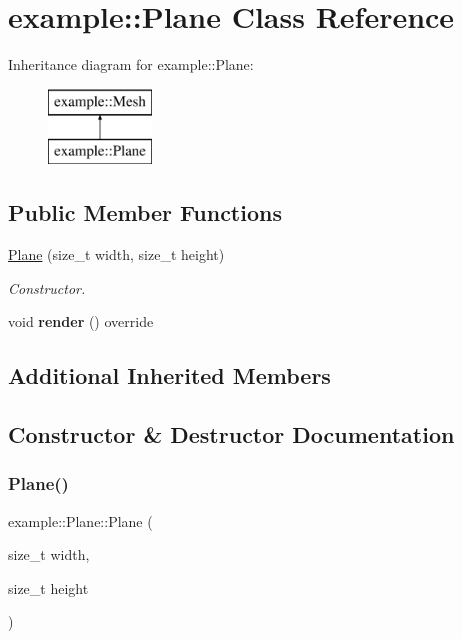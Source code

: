 \hypertarget{classexample_1_1_plane}{}\section{example\+::Plane Class Reference}
\label{classexample_1_1_plane}
Inheritance diagram for example\+::Plane\+:\begin{figure}[H]
\begin{center}
\leavevmode
\includegraphics[height=2.000000cm]{classexample_1_1_plane}
\end{center}
\end{figure}
\subsection*{Public Member Functions}
\begin{DoxyCompactItemize}
\item 
\mbox{\hyperlink{classexample_1_1_plane_a6f0771449e1f494caa9d6ba1212e5b94}{Plane}} (size\+\_\+t width, size\+\_\+t height)
\begin{DoxyCompactList}\small\item\em Constructor. \end{DoxyCompactList}\item 
\mbox{\label{classexample_1_1_plane_a17823c660d7a6afecb30ace6650662a1}} 
void {\bfseries render} () override
\end{DoxyCompactItemize}
\subsection*{Additional Inherited Members}


\subsection{Constructor \& Destructor Documentation}
\mbox{\label{classexample_1_1_plane_a6f0771449e1f494caa9d6ba1212e5b94}} 
\subsubsection{\texorpdfstring{Plane()}{Plane()}}
{\footnotesize\ttfamily example\+::\+Plane\+::\+Plane (\begin{DoxyParamCaption}\item[{size\+\_\+t}]{width,  }\item[{size\+\_\+t}]{height }\end{DoxyParamCaption})}



